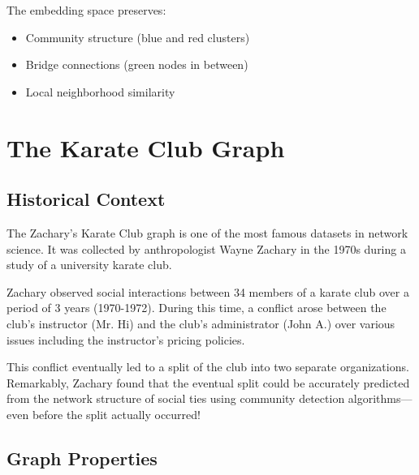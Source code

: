 \begin{notechapter}
\begin{center}
\end{center}

The embedding space preserves:
\begin{itemize}
    \item Community structure (blue and red clusters)
    \item Bridge connections (green nodes in between)
    \item Local neighborhood similarity
\end{itemize}

\section{The Karate Club Graph}
\label{graph-autoencoders:sec:karate_club}

\subsection{Historical Context}

The Zachary's Karate Club graph is one of the most famous datasets in network science. It was collected by anthropologist Wayne Zachary in the 1970s during a study of a university karate club.

\begin{tcolorbox}[colback=orange!5!white,colframe=orange!75!black,title=The Story]
Zachary observed social interactions between 34 members of a karate club over a period of 3 years (1970-1972). During this time, a conflict arose between the club's instructor (Mr. Hi) and the club's administrator (John A.) over various issues including the instructor's pricing policies.

This conflict eventually led to a split of the club into two separate organizations. Remarkably, Zachary found that the eventual split could be accurately predicted from the network structure of social ties using community detection algorithms—even before the split actually occurred!
\end{tcolorbox}

\subsection{Graph Properties}


\end{notechapter}
